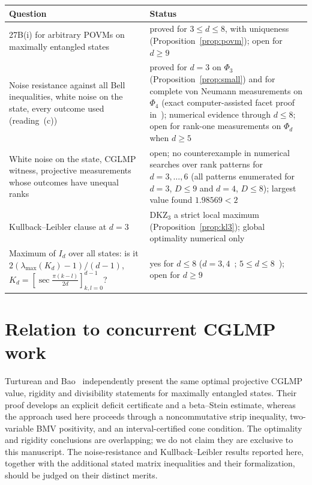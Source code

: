 \documentclass[11pt]{article}
\theoremstyle{remark}
\numberwithin{equation}{section}
\newcommand{\DKZ}{\mathrm{DKZ}}
\begin{document}
\begin{center}\footnotesize
{}\label{tab:openq}
\begin{tabular}{@{}>{\raggedright\arraybackslash}p{}>{\raggedright\arraybackslash}p{}@{}}
\toprule
Question & Status\\
\midrule
27B(i) for arbitrary POVMs on maximally entangled states & proved for $3\le d\le8$, with uniqueness
(Proposition~\ref{prop:povm}); open for $d\ge9$\\
Noise resistance against all Bell inequalities, white noise on the state, every outcome used (reading~(c)) & proved for
$d=3$ on $\Phi_3$ (Proposition~\ref{prop:small}) and for complete von Neumann measurements on $\Phi_4$
(exact computer-assisted facet proof in~\cite{repo}); numerical evidence through $d\le8$; open for
rank-one measurements on $\Phi_d$ when $d\ge5$\\
White noise on the state, CGLMP witness, projective measurements whose outcomes have unequal ranks & open; no
counterexample in numerical searches over rank patterns for $d=3,\dots,6$ (all patterns enumerated for $d=3$, $D\le9$ and
$d=4$, $D\le8$); largest value found $1.98569<2$\\
Kullback--Leibler clause at $d=3$ & $\DKZ_3$ a strict local maximum (Proposition~\ref{prop:kl3}); global optimality
numerical only\\
Maximum of $I_d$ over all states: is it $2(\lambda_{\max}(K_d)-1)/(d-1)$, $K_d=[\sec\frac{\pi(k-l)}{2d}]_{k,l=0}^{d-1}$? &
yes for $d\le8$ ($d=3,4$~\cite{IR}; $5\le d\le8$~\cite{repoCGLMP}); open for $d\ge9$\\
\bottomrule
\end{tabular}
\end{center}

\section*{Relation to concurrent CGLMP work}
Turturean and Bao~\cite{TurtureanBao26} independently present the same optimal projective CGLMP value,
rigidity and divisibility statements for maximally entangled states. Their proof develops an explicit
deficit certificate and a beta--Stein estimate, whereas the approach used here proceeds through a
noncommutative strip inequality, two-variable BMV positivity, and an interval-certified cone condition.
The optimality and rigidity conclusions are overlapping; we do not claim they are exclusive to this
manuscript. The noise-resistance and Kullback--Leibler results reported here, together with the
additional stated matrix inequalities and their formalization, should be judged on their distinct merits.
\end{document}
